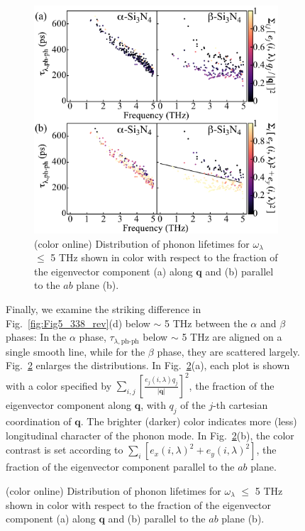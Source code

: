 \documentclass[twocolumn,amsmath,amssymb,a4paper,prb,superscriptaddress,floatfix]{revtex4-1}
\begin{document}
\begin{figure}[h]
\begin{figure}[ht]
	 \centering
	   \includegraphics[width=\linewidth]{figure_analyze_gamma3_m1010_nolog_gray.pdf} \caption{(color
		   	  online) Distribution of phonon lifetimes for $\omega_\lambda$ $\leq$ 5 THz
	  		  shown in color with respect to the fraction of the eigenvector
			  component (a) along $\mathbf q$ 
		  	  and (b) parallel to the $ab$ plane (b).} \label{fig:Fig7_338} 
	   \centering
\end{figure}

Finally, we examine the striking difference in Fig.~\ref{fig:Fig5_338_rev}(d)
below $\sim$ 5 THz between the $\alpha$ and $\beta$ phases: In the $\alpha$
phase, $\tau_{\lambda,\text{ph-ph}}$ below $\sim$ 5 THz are aligned on a single
smooth line, while for the $\beta$ phase, they are scattered largely.
Fig.~\ref{fig:Fig7_338} enlarges the distributions.
In Fig.~\ref{fig:Fig7_338}(a), each plot is shown with a color
specified by $\sum_{i,j}[\frac{e_j(i,\lambda)q_j}{|\mathbf q|}]^2$, the fraction
of the eigenvector component along $\mathbf{q}$, with $q_j$ of the $j$-th cartesian coordination of $\mathbf{q}$.
The brighter (darker) color
indicates more (less) longitudinal character of the phonon mode.  In
Fig.~\ref{fig:Fig7_338}(b), the color contrast is set according to
$\sum_{i}[e_x(i,\lambda)^2+e_y(i,\lambda)^2]$, the fraction of the eigenvector
component parallel to the $ab$ plane. 


\end{figure}
\end{document}
